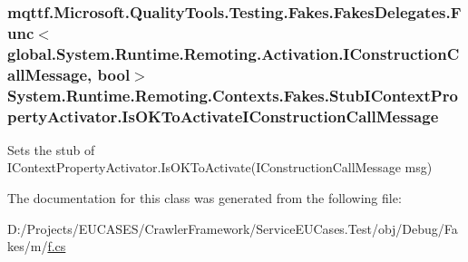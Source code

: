 \hypertarget{class_system_1_1_runtime_1_1_remoting_1_1_contexts_1_1_fakes_1_1_stub_i_context_property_activator_a20977fdc4ad146bde15d7196ef24a071}{
\subsubsection[{Is\-O\-K\-To\-Activate\-I\-Construction\-Call\-Message}]{\setlength{\rightskip}{0pt plus 5cm}mqttf.\-Microsoft.\-Quality\-Tools.\-Testing.\-Fakes.\-Fakes\-Delegates.\-Func$<$global.\-System.\-Runtime.\-Remoting.\-Activation.\-I\-Construction\-Call\-Message, bool$>$ System.\-Runtime.\-Remoting.\-Contexts.\-Fakes.\-Stub\-I\-Context\-Property\-Activator.\-Is\-O\-K\-To\-Activate\-I\-Construction\-Call\-Message}}\label{class_system_1_1_runtime_1_1_remoting_1_1_contexts_1_1_fakes_1_1_stub_i_context_property_activator_a20977fdc4ad146bde15d7196ef24a071}


Sets the stub of I\-Context\-Property\-Activator.\-Is\-O\-K\-To\-Activate(\-I\-Construction\-Call\-Message msg)



The documentation for this class was generated from the following file\-:\begin{DoxyCompactItemize}
\item 
D\-:/\-Projects/\-E\-U\-C\-A\-S\-E\-S/\-Crawler\-Framework/\-Service\-E\-U\-Cases.\-Test/obj/\-Debug/\-Fakes/m/\hyperlink{m_2f_8cs}{f.\-cs}\end{DoxyCompactItemize}
